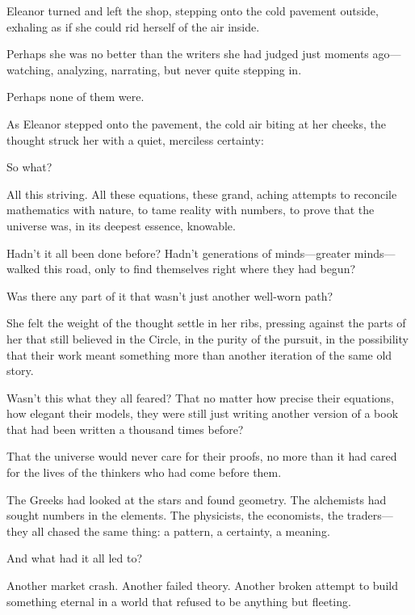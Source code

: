 Eleanor turned and left the shop, stepping onto the cold pavement outside, exhaling as if she could rid herself of the air inside.

Perhaps she was no better than the writers she had judged just moments ago—watching, analyzing, narrating, but never quite stepping in.

Perhaps none of them were.


As Eleanor stepped onto the pavement, the cold air biting at her cheeks, the thought struck her with a quiet, merciless certainty:

So what?

All this striving. All these equations, these grand, aching attempts to reconcile mathematics with nature, to tame reality with numbers, to prove that the universe was, in its deepest essence, knowable.

Hadn’t it all been done before? Hadn’t generations of minds—greater minds—walked this road, only to find themselves right where they had begun?

Was there any part of it that wasn’t just another well-worn path?

She felt the weight of the thought settle in her ribs, pressing against the parts of her that still believed in the Circle, in the purity of the pursuit, in the possibility that their work meant something more than another iteration of the same old story.

Wasn’t this what they all feared? That no matter how precise their equations, how elegant their models, they were still just writing another version of a book that had been written a thousand times before?

That the universe would never care for their proofs, no more than it had cared for the lives of the thinkers who had come before them.

The Greeks had looked at the stars and found geometry. The alchemists had sought numbers in the elements. The physicists, the economists, the traders—they all chased the same thing: a pattern, a certainty, a meaning.

And what had it all led to?

Another market crash. Another failed theory. Another broken attempt to build something eternal in a world that refused to be anything but fleeting.

